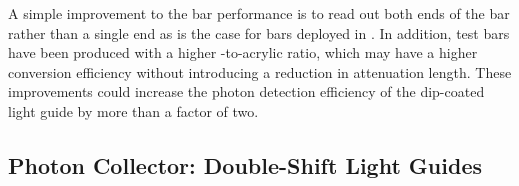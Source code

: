




 A simple improvement to the bar performance is to read out both ends of the bar rather than a single end as is the case for bars deployed in .  
In addition, test bars have been produced with a higher -to-acrylic ratio, which may have a higher conversion efficiency without introducing a reduction in attenuation length. These improvements could increase the photon detection efficiency of the dip-coated light guide by more than a factor of two.

\subsection{Photon Collector: Double-Shift Light Guides}
\label{ssec:fdsp-pd-pc-bar2}

